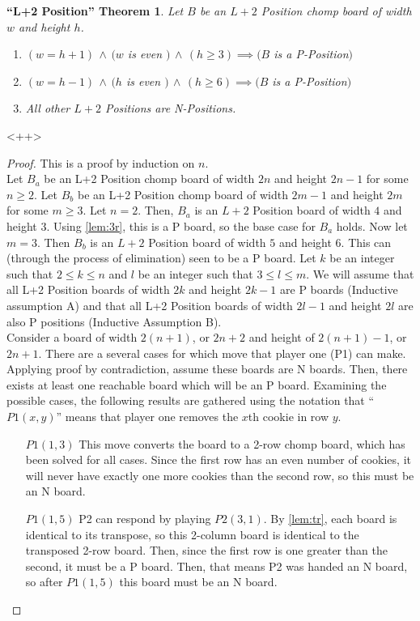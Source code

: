 \documentclass[a4paper,11pt,oneside]{article}
\begin{document}
\newtheorem{theorem}{ ``L+2 Position'' Theorem}
\begin{theorem}
	Let $B$ be an $L+2$ Position chomp board of width $w$ and height $h$.
	\begin{enumerate}
		\item $(w = h + 1) \,\land\, (w$ is even $)\,\land\,( h \geq 3) \implies (B$ is a P-Position$)$
		\item $(w = h - 1) \,\land\, (h$ is even $)\,\land\,( h \geq 6) \implies (B$ is a P-Position$)$
		\item All other $L+2$ Positions are N-Positions.
	\end{enumerate}
\end{theorem}<++>

\begin{proof}
This is a proof by induction on $n$.\\
Let $B_a$ be an L+2 Position chomp board of width $2n$ and height $2n-1$ for some $n \geq 2$.  Let $B_b$ be an L+2 Position chomp board of width $2m-1$ and height $2m$ for some $m \geq 3$.  Let $n = 2$.  Then, $B_a$ is an $L+2$ Position board of width $4$ and height $3$.  Using \ref{lem:3r}, this is a P board, so the base case for $B_a$ holds.  Now let $m = 3$.  Then $B_b$ is an $L+2$ Position board of width $5$ and height $6$.  This can (through the process of elimination) seen to be a P board.  Let $k$ be an integer such that $2 \leq k \leq n$ and $l$ be an integer such that $3 \leq l \leq m$.  We will assume that all L+2 Position boards of width $2k$ and height $2k-1$ are P boards (Inductive assumption A) and that all L+2 Position boards of width $2l-1$ and height $2l$ are also P positions (Inductive Assumption B).\\
Consider a board of width $2(n+1)$, or $2n+2$ and height of $2(n+1)-1$, or $2n + 1$.  There are a several cases for which move that player one (P1) can make.  Applying proof by contradiction, assume these boards are N boards.  Then, there exists at least one reachable board which will be an P board.  Examining the possible cases, the following results are gathered using the  notation that ``$P1(x,y)$'' means that player one removes the $x$th cookie in row $y$.
\begin{itemize}
	\item [$P1(1, 3)$] This move converts the board to a 2-row chomp board, which has been solved for all cases.  Since the first row has an even number of cookies, it will never have exactly one more cookies than the second row, so this must be an N board.
	\item [$P1(1,5)$] P2 can respond by playing $P2(3,1)$. By \ref{lem:tr}, each board is identical to its transpose, so this 2-column board is identical to the transposed 2-row board.  Then, since the first row is one greater than the second, it must be a P board.  Then, that means P2 was handed an N board, so after $P1(1,5)$ this board must be an N board. 

\end{itemize}
\end{proof}
\end{document}
